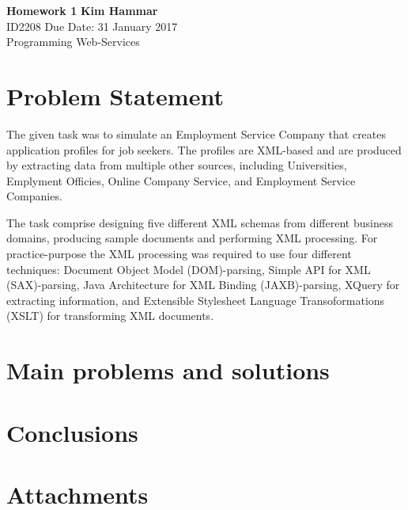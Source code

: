 \documentclass[a4paper, 11pt]{article}
\begin{document}
\noindent
\large\textbf{Homework 1} \hfill \textbf{Kim Hammar} \\
\normalsize ID2208 \hfill Due Date: 31 January 2017 \\
Programming Web-Services \hfill \\

\section*{Problem Statement}
The given task was to simulate an Employment Service Company that creates application profiles for job seekers. The profiles are XML-based and are produced by extracting data from multiple other sources, including Universities, Emplyment Officies, Online Company Service, and Employment Service Companies.

The task comprise designing five different XML schemas from different business domains, producing sample documents and performing XML processing. For practice-purpose the XML processing was required to use four different techniques: Document Object Model (DOM)-parsing, Simple API for XML (SAX)-parsing, Java Architecture for XML Binding (JAXB)-parsing, XQuery for extracting information,  and Extensible Stylesheet Language Transoformations (XSLT) for transforming XML documents. 
\section*{Main problems and solutions}

\section*{Conclusions}

\section*{Attachments}

{}

\end{document}
